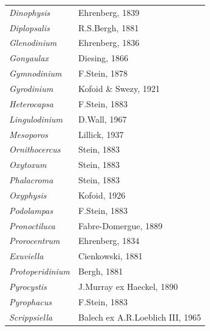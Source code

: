 \documentclass[]{agujournal2019}
\begin{document}
\begin{table}
{\begin{tabular}{@{}ll@{}}
\textit{Dinophysis}        & Ehrenberg, 1839                                            \\
\textit{Diplopsalis}       & R.S.Bergh, 1881                                            \\
\textit{Glenodinium}       & Ehrenberg, 1836     
\\
\textit{Gonyaulax}         & Diesing, 1866                                              \\
\textit{Gymnodinium}       & F.Stein, 1878                                              \\
\textit{Gyrodinium}        & Kofoid \& Swezy, 1921                                      \\
\textit{Heterocapsa}       & F.Stein, 1883                                              \\
\textit{Lingulodinium}     & D.Wall, 1967                                               \\
\textit{Mesoporos}         & Lillick, 1937                                              \\
\textit{Ornithocercus}     & Stein, 1883                                                \\
\textit{Oxytoxum}          & Stein, 1883                                                \\
\textit{Phalacroma}        & Stein, 1883                                                \\
\textit{Oxyphysis}         & Kofoid, 1926                                               \\
\textit{Podolampas}        & F.Stein, 1883                                              \\
\textit{Pronoctiluca}      & Fabre-Domergue, 1889                                       \\
\textit{Prorocentrum}      & Ehrenberg, 1834                                            \\
\textit{Exuviella}         & Cienkowski, 1881                                           \\
\textit{Protoperidinium}   & Bergh, 1881                                                \\
\textit{Pyrocystis}        & J.Murray ex Haeckel, 1890                                  \\
\textit{Pyrophacus}        & F.Stein, 1883                                              \\
\textit{Scrippsiella}      & Balech ex A.R.Loeblich III, 1965                           \\

\end{tabular}}
\end{table}
\end{document}
